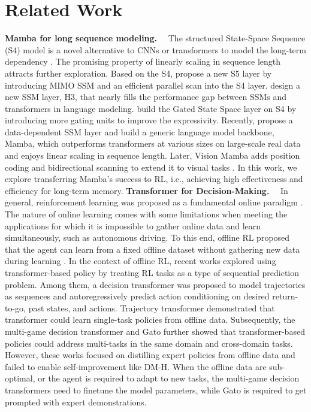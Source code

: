 \documentclass{article}
\begin{document}
\section{Related Work}
\noindent\textbf{Mamba for long sequence modeling.}~~
The structured State-Space Sequence (S4) model is a novel alternative to CNNs or transformers to model the long-term dependency \cite{12}. The promising property of linearly scaling in sequence length attracts further exploration. Based on the S4, \citet{16} propose a new S5 layer by introducing MIMO SSM and an efficient parallel scan into the S4 layer. \citet{17} design a new SSM layer, H3, that nearly fills the performance gap between SSMs and transformers in language modeling. \citet{18} build the Gated State Space layer on S4 by introducing more gating units to improve the expressivity.
Recently, \citet{10} propose a data-dependent SSM layer and build a generic language model backbone, Mamba, which outperforms transformers at various sizes on large-scale real data and enjoys linear scaling in sequence length. Later, Vision Mamba adds position coding and bidirectional scanning to extend it to visual tasks \cite{11}.
In this work, we explore transferring Mamba's success to RL, i.e., achieving high effectiveness and efficiency for long-term memory.
\noindent\textbf{Transformer for Decision-Making.}~~
In general, reinforcement learning was proposed as a fundamental online paradigm \cite{38}. The nature of online learning comes with some limitations when meeting the applications for which it is impossible to gather online data and learn simultaneously, such as autonomous driving. To this end, offline RL proposed that the agent can learn from a fixed offline dataset without gathering new data during learning \cite{39,40,41,42}. In the context of offline RL, recent works explored using transformer-based policy by treating RL tasks as a type of sequential prediction problem. Among them, a decision transformer \cite{2} was proposed to model trajectories as sequences and autoregressively predict action conditioning on desired return-to-go, past states, and actions. Trajectory transformer \cite{43} demonstrated that transformer could learn single-task policies from offline data. Subsequently, the multi-game decision transformer \cite{14} and Gato \cite{27} further showed that transformer-based policies could address multi-tasks in the same domain and cross-domain tasks. However, these works focused on distilling expert policies from offline data and failed to enable self-improvement like DM-H. When the offline data are sub-optimal, or the agent is required to adapt to new tasks, the multi-game decision transformers need to finetune the model parameters, while Gato is required to get prompted with expert demonstrations.
\end{document}
